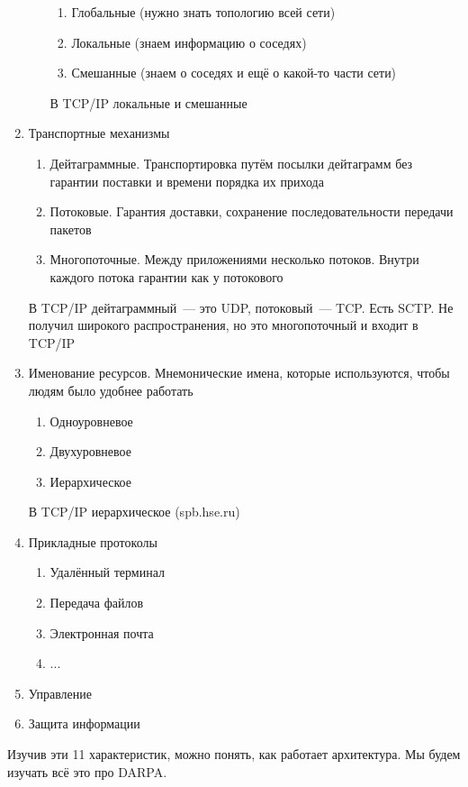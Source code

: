 \begin{enumerate}
\begin{enumerate}
\begin{enumerate}
            \item Глобальные (нужно знать топологию всей сети)
            \item Локальные (знаем информацию о соседях)
            \item Смешанные (знаем о соседях и ещё о какой-то части сети)
        \end{enumerate}
        В TCP/IP локальные и смешанные
    \end{enumerate}
    \item Транспортные механизмы
    \begin{enumerate}
        \item Дейтаграммные. Транспортировка путём посылки дейтаграмм без гарантии поставки и времени порядка их прихода
        \item Потоковые. Гарантия доставки, сохранение последовательности передачи пакетов
        \item Многопоточные. Между приложениями несколько потоков. Внутри каждого потока гарантии как у потокового
    \end{enumerate}
    В TCP/IP дейтаграммный~--- это UDP, потоковый~--- TCP. Есть SCTP. Не получил широкого распространения, но это многопоточный и входит в TCP/IP
    \item Именование ресурсов. Мнемонические имена, которые используются, чтобы людям было удобнее работать
    \begin{enumerate}
        \item Одноуровневое
        \item Двухуровневое
        \item Иерархическое
    \end{enumerate}   
    В TCP/IP иерархическое (spb.hse.ru)
    \item Прикладные протоколы
    \begin{enumerate}
        \item Удалённый терминал
        \item Передача файлов
        \item Электронная почта
        \item ...
    \end{enumerate}
    \item Управление
    \item Защита информации
\end{enumerate}

Изучив эти 11 характеристик, можно понять, как работает архитектура. Мы будем изучать всё это про DARPA.

